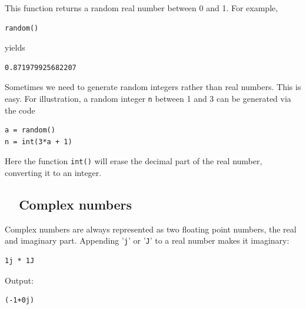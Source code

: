 \documentclass[article,A4,12pt]{llncs}
\begin{document}
\noindent
This function returns a random real number between 0 and 1. For 
example,\\

\begin{bbox}
\begin{verbatim}
random()
\end{verbatim}
\end{bbox}
\vspace{6mm}

\noindent
yields\\

\begin{ybox}
\begin{verbatim}
0.871979925682207
\end{verbatim}
\end{ybox}
\vspace{6mm}

\noindent
Sometimes we need to generate random integers rather than real numbers.
This is easy. For illustration, a random integer {\tt n} between 1 and 3 can be 
generated via the code\\

\begin{bbox}
\begin{verbatim}
a = random()
n = int(3*a + 1)
\end{verbatim}
\end{bbox}
\vspace{6mm}

\noindent
Here the function {\tt int()} will erase the decimal part of the real number, converting 
it to an integer.


\subsection{\ \ Complex numbers}

Complex numbers are always represented as two floating point numbers, the 
real and imaginary part. Appending '{\tt j}' or  '{\tt J}' to a real number
makes it imaginary:\\

\begin{bbox}
\begin{verbatim}
1j * 1J
\end{verbatim}
\end{bbox}
\vspace{6mm}

\noindent
Output:\\

\begin{ybox}
\begin{verbatim}
(-1+0j)
\end{verbatim}
\end{ybox}
\vspace{6mm}
\end{document}
